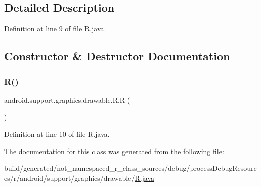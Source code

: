 \subsection{Detailed Description}


Definition at line 9 of file R.\+java.



\subsection{Constructor \& Destructor Documentation}
\mbox{\label{classandroid_1_1support_1_1graphics_1_1drawable_1_1_r_a5cc28100d772dee9f3d968e4e284eec3}} 
\subsubsection{\texorpdfstring{R()}{R()}}
{\footnotesize\ttfamily android.\+support.\+graphics.\+drawable.\+R.\+R (\begin{DoxyParamCaption}{ }\end{DoxyParamCaption})\hspace{0.3cm}{\ttfamily [private]}}



Definition at line 10 of file R.\+java.


\begin{DoxyCode}{0}

\end{DoxyCode}


The documentation for this class was generated from the following file\+:\begin{DoxyCompactItemize}
\item 
build/generated/not\+\_\+namespaced\+\_\+r\+\_\+class\+\_\+sources/debug/process\+Debug\+Resources/r/android/support/graphics/drawable/\mbox{\hyperlink{android_2support_2graphics_2drawable_2_r_8java}{R.\+java}}\end{DoxyCompactItemize}
